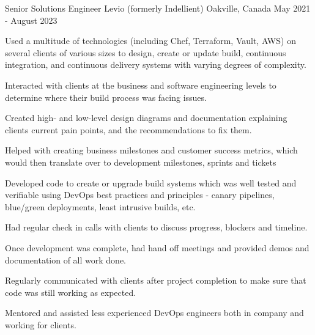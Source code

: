 \begin{cventries}
  \cventry
    {Senior Solutions Engineer} %
    {Levio (formerly Indellient)} %
    {Oakville, Canada} %
    {May 2021 - August 2023} %
    {
      \begin{cvitems} %
        \item {Used a multitude of technologies (including Chef, Terraform, Vault, AWS) on several clients of various sizes to design, create or update build, continuous integration, and continuous delivery systems with varying degrees of complexity.}
        \item {Interacted with clients at the business and software engineering levels to determine where their build process was facing issues.}
        \item {Created high- and low-level design diagrams and documentation explaining clients current pain points, and the recommendations to fix them.}
        \item {Helped with creating business milestones and customer success metrics, which would then translate over to development milestones, sprints and tickets}
        \item {Developed code to create or upgrade build systems which was well tested and verifiable using DevOps best practices and principles - canary pipelines, blue/green deployments, least intrusive builds, etc.}
        \item {Had regular check in calls with clients to discuss progress, blockers and timeline.}
        \item {Once development was complete, had hand off meetings and provided demos and documentation of all work done.}
        \item {Regularly communicated with clients after project completion to make sure that code was still working as expected.}
        \item {Mentored and assisted less experienced DevOps engineers both in company and working for clients.}
      \end{cvitems}
    }


\end{cventries}

